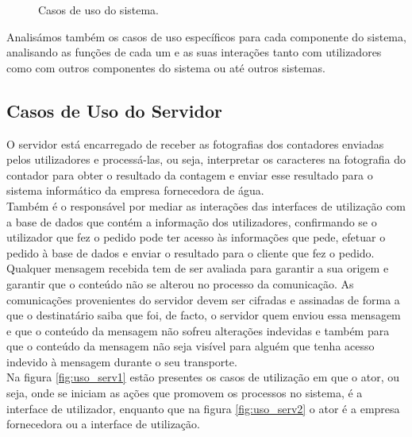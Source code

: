 \begin{figure}[h!]
\begin{center}
\caption{Casos de uso do sistema.}
\label{fig:uso_sistema}
\end{center}
\end{figure}

Analisámos também os casos de uso específicos para cada componente do sistema, analisando as funções de cada um e as suas interações tanto com utilizadores como com outros componentes do sistema ou até outros sistemas.

\subsection{Casos de Uso do Servidor}
O servidor está encarregado de receber as fotografias dos contadores enviadas pelos utilizadores e processá-las, ou seja, interpretar os caracteres na fotografia do contador para obter o resultado da contagem e enviar esse resultado para o sistema informático da empresa fornecedora de água.\\
Também é o responsável por mediar as interações das interfaces de utilização com a base de dados que contém a informação dos utilizadores, confirmando se o utilizador que fez o pedido pode ter acesso às informações que pede, efetuar o pedido à base de dados e enviar o resultado para o cliente que fez o pedido.\\
Qualquer mensagem recebida tem de ser avaliada para garantir a sua origem e garantir que o conteúdo não se alterou no processo da comunicação. As comunicações provenientes do servidor devem ser cifradas e assinadas de forma a que o destinatário saiba que foi, de facto, o servidor quem enviou essa mensagem e que o conteúdo da mensagem não sofreu alterações indevidas e também para que o conteúdo da mensagem não seja visível para alguém que tenha acesso indevido à mensagem durante o seu transporte.\\
Na figura \ref{fig:uso_serv1} estão presentes os casos de utilização em que o ator, ou seja, onde se iniciam as ações que promovem os processos no sistema, é a interface de utilizador, enquanto que na figura \ref{fig:uso_serv2} o ator é a empresa fornecedora ou a interface de utilização.

